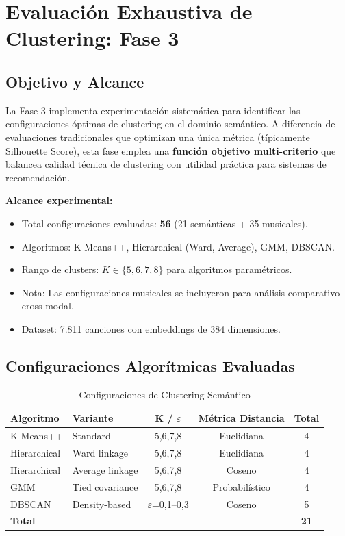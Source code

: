 \section{Evaluación Exhaustiva de Clustering: Fase 3}
\label{sec:clustering-fase3}

\subsection{Objetivo y Alcance}
\label{subsec:objetivo-fase3}

La Fase 3 implementa experimentación sistemática para identificar las configuraciones óptimas de clustering en el dominio semántico. A diferencia de evaluaciones tradicionales que optimizan una única métrica (típicamente Silhouette Score), esta fase emplea una \textbf{función objetivo multi-criterio} que balancea calidad técnica de clustering con utilidad práctica para sistemas de recomendación.

\textbf{Alcance experimental:}
\begin{itemize}
    \item Total configuraciones evaluadas: \textbf{56} (21 semánticas + 35 musicales).
    \item Algoritmos: K-Means++, Hierarchical (Ward, Average), GMM, DBSCAN.
    \item Rango de clusters: $K \in \{5, 6, 7, 8\}$ para algoritmos paramétricos.
    \item Nota: Las configuraciones musicales se incluyeron para análisis comparativo cross-modal.
    \item Dataset: 7.811 canciones con embeddings de 384 dimensiones.
\end{itemize}

\subsection{Configuraciones Algorítmicas Evaluadas}
\label{subsec:configuraciones-fase3}

\begin{table}[htbp]
\centering
\caption{Configuraciones de Clustering Semántico}
\label{tab:config-clustering}
\begin{tabular}{llccc}
\toprule
\textbf{Algoritmo} & \textbf{Variante} & \textbf{K / $\varepsilon$} & \textbf{Métrica Distancia} & \textbf{Total} \\
\midrule
K-Means++ & Standard & 5,6,7,8 & Euclidiana & 4 \\
Hierarchical & Ward linkage & 5,6,7,8 & Euclidiana & 4 \\
Hierarchical & Average linkage & 5,6,7,8 & Coseno & 4 \\
GMM & Tied covariance & 5,6,7,8 & Probabilístico & 4 \\
DBSCAN & Density-based & $\varepsilon$=0,1--0,3 & Coseno & 5 \\
\midrule
\textbf{Total} & & & & \textbf{21} \\
\bottomrule
\end{tabular}
\end{table}

